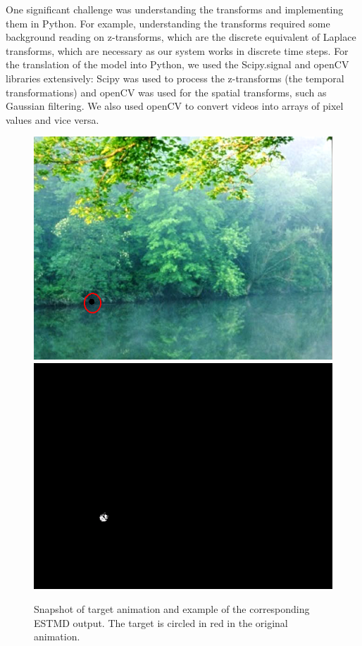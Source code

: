 \documentclass[a4paper,11pt]{article}
\begin{document}
	One significant challenge was understanding the transforms and implementing them in Python. For example, understanding the transforms required some background reading on z-transforms, which are the discrete equivalent of Laplace transforms, which are necessary as our system works in discrete time steps. For the translation of the model into Python, we used the Scipy.signal and openCV \cite{opencv} libraries extensively: Scipy was used to process the z-transforms (the temporal transformations) and openCV was used for the spatial transforms, such as Gaussian filtering. We also used openCV to convert videos into arrays of pixel values and vice versa.
\begin{figure}[h]
\includegraphics[scale = 0.4]{input}
\includegraphics[scale = 0.5]{processed}
\caption{Snapshot of target animation and example of the corresponding ESTMD output. The target is circled in red in the original animation.}
\end{figure}
\end{document}
